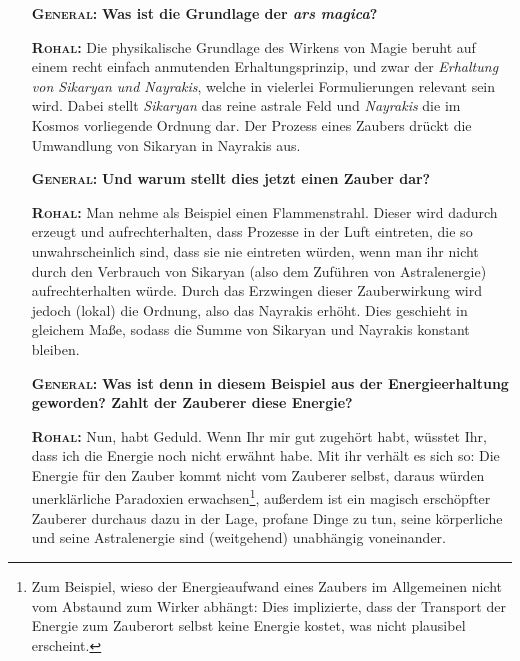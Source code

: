 \begin{itemize}
\item[\textbf{\textsc{General}:}]
\textbf{Was ist die Grundlage der \emph{ars magica}?}
\item[\textbf{\textsc{Rohal}:}]
Die physikalische Grundlage des Wirkens von Magie beruht auf einem recht einfach anmutenden Erhaltungsprinzip, und zwar der \emph{Erhaltung von Sikaryan und Nayrakis}, welche in vielerlei Formulierungen relevant sein wird. Dabei stellt \emph{Sikaryan} das reine astrale Feld und \emph{Nayrakis} die im Kosmos vorliegende Ordnung dar. Der Prozess eines Zaubers drückt die Umwandlung von Sikaryan in Nayrakis aus.
\item[\textbf{\textsc{General}:}]
\textbf{Und warum stellt dies jetzt einen Zauber dar?}
\item[\textbf{\textsc{Rohal}:}]
Man nehme als Beispiel einen Flammenstrahl. Dieser wird dadurch erzeugt und aufrechterhalten, dass Prozesse in der Luft eintreten, die so unwahrscheinlich sind, dass sie nie eintreten würden, wenn man ihr nicht durch den Verbrauch von Sikaryan (also dem Zuführen von Astralenergie) aufrechterhalten würde. Durch das Erzwingen dieser Zauberwirkung wird jedoch (lokal) die Ordnung, also das Nayrakis erhöht. Dies geschieht in gleichem Maße, sodass die Summe von Sikaryan und Nayrakis konstant bleiben. 
\item[\textbf{\textsc{General}:}]
\textbf{Was ist denn in diesem Beispiel aus der Energieerhaltung geworden? Zahlt der Zauberer diese Energie?}
\item[\textbf{\textsc{Rohal}:}]
Nun, habt Geduld. Wenn Ihr mir gut zugehört habt, wüsstet Ihr, dass ich die Energie noch nicht erwähnt habe. Mit ihr verhält es sich so: Die Energie für den Zauber kommt nicht vom Zauberer selbst, daraus würden unerklärliche Paradoxien erwachsen\footnote{Zum Beispiel, wieso der Energieaufwand eines Zaubers im Allgemeinen nicht vom Abstaund zum Wirker abhängt: Dies implizierte, dass der Transport der Energie zum Zauberort selbst keine Energie kostet, was nicht plausibel erscheint.}, außerdem ist ein magisch erschöpfter Zauberer durchaus dazu in der Lage, profane Dinge zu tun, seine körperliche und seine Astralenergie sind (weitgehend) unabhängig voneinander.
\end{itemize}
